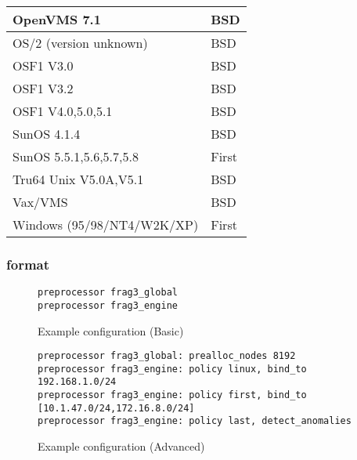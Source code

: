 \documentclass[english]{report}
\begin{document}
\begin{itemize}
\begin{itemize}
\begin{tabular}{| l | l |}
                        \hline
                  OpenVMS 7.1  & BSD \\
                        \hline
       OS/2 (version unknown)  & BSD \\
                        \hline
                    OSF1 V3.0  & BSD \\
                        \hline
                    OSF1 V3.2  & BSD \\
                        \hline
            OSF1 V4.0,5.0,5.1  & BSD \\
                        \hline
                  SunOS 4.1.4  & BSD \\
                        \hline
      SunOS 5.5.1,5.6,5.7,5.8  & First \\
                        \hline
        Tru64 Unix V5.0A,V5.1  & BSD \\
                        \hline
                      Vax/VMS  & BSD \\
                        \hline
   Windows (95/98/NT4/W2K/XP)  & First\\
                        \hline
                        \end{tabular}

 \end{itemize}
\end{itemize}

\subsubsection{format}

\begin{figure}[!hbpt]
\begin{verbatim}
preprocessor frag3_global
preprocessor frag3_engine
\end{verbatim}

\caption{Example configuration (Basic)\label{Frag3 Example Basic}}
\end{figure}

\begin{figure}[!hbpt]
\begin{verbatim}
preprocessor frag3_global: prealloc_nodes 8192 
preprocessor frag3_engine: policy linux, bind_to 192.168.1.0/24
preprocessor frag3_engine: policy first, bind_to [10.1.47.0/24,172.16.8.0/24]
preprocessor frag3_engine: policy last, detect_anomalies
\end{verbatim}

\caption{Example configuration (Advanced)\label{Frag3 Example Advanced}}
\end{figure}
\end{document}
